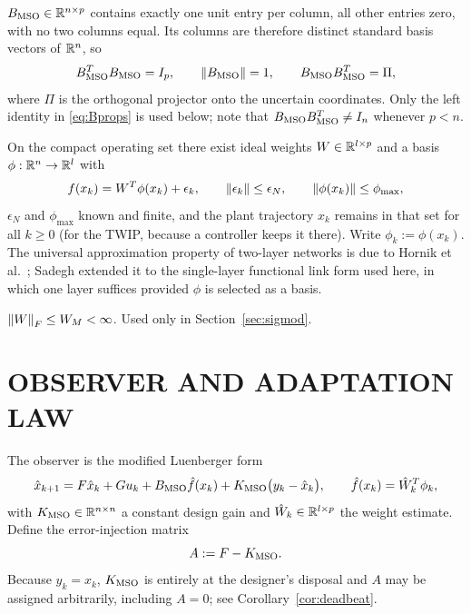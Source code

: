 \begin{assumption}\label{as:B}
$B_{\mathrm{MSO}}\in\mathbb{R}^{n\times p}$ contains exactly one unit entry per column, all other
entries zero, with no two columns equal. Its columns are therefore distinct
standard basis vectors of $\mathbb{R}^n$, so
\begin{equation}\label{eq:Bprops}
B_{\mathrm{MSO}}^TB_{\mathrm{MSO}}=I_p,\qquad \left\lVert B_{\mathrm{MSO}} \right\rVert=1,\qquad B_{\mathrm{MSO}}B_{\mathrm{MSO}}^T=\Pi,
\end{equation}
where $\Pi$ is the orthogonal projector onto the uncertain coordinates. Only the
left identity in \eqref{eq:Bprops} is used below; note that
$B_{\mathrm{MSO}}B_{\mathrm{MSO}}^T\neq I_n$ whenever $p<n$.
\end{assumption}

\begin{assumption}\label{as:nn}
On the compact operating set there exist ideal weights $W\in\mathbb{R}^{l\times p}$ and
a basis $\phi:\mathbb{R}^n\to\mathbb{R}^l$ with
\begin{equation}\label{eq:fla}
f(x_k)=W^T\phi(x_k)+\epsilon_k,\qquad
\left\lVert \epsilon_k \right\rVert\le\epsilon_N,\qquad
\left\lVert \phi(x_k) \right\rVert\le\phi_{\max},
\end{equation}
$\epsilon_N$ and $\phi_{\max}$ known and finite, and the plant trajectory
$x_k$ remains in that set for all $k\ge0$ (for the TWIP, because a controller
keeps it there). Write $\phi_k:=\phi(x_k)$. The
universal approximation property of two-layer networks is due to Hornik et al.\
\cite{hornik1989multilayer}; Sadegh \cite{sadegh1993nonlinear} extended it to the
single-layer functional link form used here, in which one layer suffices provided
$\phi$ is selected as a basis.
\end{assumption}

\begin{assumption}\label{as:WM}
$\left\lVert W \right\rVert_F\le W_M<\infty$. Used only in Section~\ref{sec:sigmod}.
\end{assumption}

\section{OBSERVER AND ADAPTATION LAW}

The observer is the modified Luenberger form
\begin{equation}\label{eq:obs}
\hat{x}_{k+1}=F\hat{x}_k+Gu_k+B_{\mathrm{MSO}}\hat{f}(x_k)+K_{\mathrm{MSO}}\bigl(y_k-\hat{x}_k\bigr),
\qquad
\hat{f}(x_k)=\hat{W}_k^T\phi_k,
\end{equation}
with $K_{\mathrm{MSO}}\in\mathbb{R}^{n\times n}$ a constant design gain and $\hat{W}_k\in\mathbb{R}^{l\times p}$
the weight estimate. Define the error-injection matrix
\begin{equation}\label{eq:A}
A:=F-K_{\mathrm{MSO}} .
\end{equation}
Because $y_k=x_k$, $K_{\mathrm{MSO}}$ is entirely at the designer's disposal and $A$ may be
assigned arbitrarily, including $A=0$; see Corollary~\ref{cor:deadbeat}.


